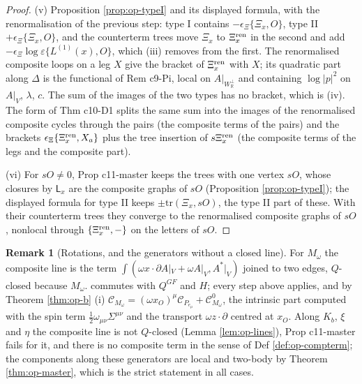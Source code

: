 \documentclass[11pt]{article}
\numberwithin{equation}{section}
\theoremstyle{plain}
\theoremstyle{definition}
\newtheorem{remark}[theorem]{Remark}
\newcommand{\Ap}{A|_{W_{\mathbb R}^\perp}}
\newcommand{\AV}{A|_V}
\newcommand{\Comp}{\mathcal C}
\begin{document}
\begin{proof}
(v) Proposition \ref{prop:op-typeI} and its displayed formula, with the renormalisation of the previous step: type I contains $-\epsilon_\Xi\{\Xi_x,O\}$, type II $+\epsilon_\Xi\{\Xi_x,O\}$, and the counterterm trees move $\Xi_x$ to $\Xi^{\rm ren}_x$ in the second and add $-\epsilon_\Xi\log\varepsilon\{L^{(1)}(x),O\}$, which (iii) removes from the first. The renormalised composite loops on a leg $X$ give the bracket of $\Xi^{\rm ren}_x$ with $X$; its quadratic part along $\Delta$ is the functional of Rem c9-Pi, local on $\Ap$ and containing $\log|p|^2$ on $\AV$, $\lambda$, $c$. The sum of the images of the two types has no bracket, which is (iv). The form of Thm c10-D1 splits the same sum into the images of the renormalised composite cycles through the pairs (the composite terms of the pairs) and the brackets $\epsilon_\Xi\{\Xi^{\rm ren}_x,X_a\}$ plus the tree insertion of $s\Xi^{\rm ren}_x$ (the composite terms of the legs and the composite part).

(vi) For $sO\neq0$, Prop c11-master keeps the trees with one vertex $sO$, whose closures by $\mathsf L_x$ are the composite graphs of $sO$ (Proposition \ref{prop:op-typeI}); the displayed formula for type II keeps $\pm\mathrm{tr}(\Xi_x,sO)$, the type II part of these. With their counterterm trees they converge to the renormalised composite graphs of $sO$, nonlocal through $\{\Xi^{\rm ren}_x,-\}$ on the letters of $sO$.
\end{proof}

\begin{remark}[Rotations, and the generators without a closed line]
\label{rem:op-localM}
For $M_\omega$ the composite line is the term $\int(\omega x\cdot\partial\AV+\omega\AV,A^*|_V)$ joined to two edges, $Q$-closed because $M_\omega.$ commutes with $Q^{GF}$ and $H$; every step above applies, and by Theorem \ref{thm:op-b} (i) $\Comp_{M_\omega}=(\omega x_O)^\mu\Comp_{P_{e_\mu}}+\Comp^0_{M_\omega}$, the intrinsic part computed with the spin term $\tfrac12\omega_{\mu\nu}\Sigma^{\mu\nu}$ and the transport $\omega z\cdot\partial$ centred at $x_O$. Along $K_b$, $\xi$ and $\eta$ the composite line is not $Q$-closed (Lemma \ref{lem:op-lines}), Prop c11-master fails for it, and there is no composite term in the sense of Def \ref{def:op-compterm}; the components along these generators are local and two-body by Theorem \ref{thm:op-master}, which is the strict statement in all cases.
\end{remark}
\end{document}
